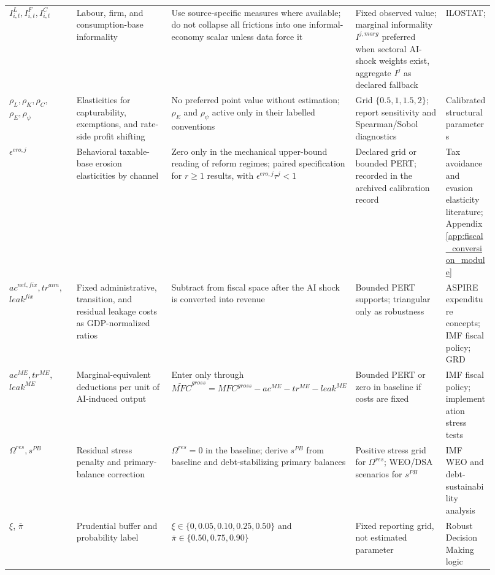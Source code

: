 \documentclass[11pt,a4paper]{article}
\begin{document}
\begin{landscape}
\begin{longtable}{@{}p{0.14\linewidth}p{0.22\linewidth}p{0.25\linewidth}p{0.20\linewidth}p{0.11\linewidth}@{}}
$I^L_{i,t}, I^F_{i,t}, I^C_{i,t}$ & Labour, firm, and consumption-base informality & Use source-specific measures where available; do not collapse all frictions into one informal-economy scalar unless data force it & Fixed observed value; marginal informality $I^{j,marg}$ preferred when sectoral AI-shock weights exist, aggregate $I^j$ as declared fallback & ILOSTAT; \citet{worldbank2021informality,medina2018shadow} \\
$\rho_L,\rho_K,\rho_C,$\newline $\rho_E,\rho_\psi$ & Elasticities for capturability, exemptions, and rate-side profit shifting & No preferred point value without estimation; $\rho_E$ and $\rho_\psi$ active only in their labelled conventions & Grid $\{0.5,1,1.5,2\}$; report sensitivity and Spearman/Sobol diagnostics & Calibrated structural parameters \\
$\epsilon^{ero,j}$ & Behavioral taxable-base erosion elasticities by channel & Zero only in the mechanical upper-bound reading of reform regimes; paired specification for $r\geq1$ results, with $\epsilon^{ero,j}\tau^j<1$ & Declared grid or bounded PERT; recorded in the archived calibration record & Tax avoidance and evasion elasticity literature; Appendix \ref{app:fiscal_conversion_module} \\
$ac^{net,fix},tr^{ann},$\newline $leak^{fix}$ & Fixed administrative, transition, and residual leakage costs as GDP-normalized ratios & Subtract from fiscal space after the AI shock is converted into revenue & Bounded PERT supports; triangular only as robustness & ASPIRE expenditure concepts; IMF fiscal policy; GRD \\
$ac^{ME},tr^{ME},$\newline $leak^{ME}$ & Marginal-equivalent deductions per unit of AI-induced output & Enter only through $\widetilde{MFC}^{gross}=MFC^{gross}-ac^{ME}-tr^{ME}-leak^{ME}$ & Bounded PERT or zero in baseline if costs are fixed & IMF fiscal policy; implementation stress tests \\
$\Omega^{res},s^{PB}$ & Residual stress penalty and primary-balance correction & $\Omega^{res}=0$ in the baseline; derive $s^{PB}$ from baseline and debt-stabilizing primary balances & Positive stress grid for $\Omega^{res}$; WEO/DSA scenarios for $s^{PB}$ & IMF WEO and debt-sustainability analysis \\
$\xi$, $\bar\pi$ & Prudential buffer and probability label & $\xi\in\{0,0.05,0.10,0.25,0.50\}$ and $\bar\pi\in\{0.50,0.75,0.90\}$ & Fixed reporting grid, not estimated parameter & Robust Decision Making logic \citep{lempert2003shaping,rand2013rdm} \\
\bottomrule
\end{longtable}
\endgroup
\end{landscape}
\end{document}
